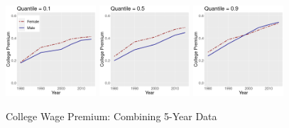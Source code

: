 \documentclass[beamer, t]{beamer}
\begin{document}
\begin{frame}
	
	\bigskip
	
	\begin{figure}[!h]
		\centering
		\caption{College Wage Premium: %
			Combining 5-Year Data %
		}
	\bigskip
			\includegraphics[width=0.3\textwidth]{chart_1_03_FullT_5yr.png}  \includegraphics[width=0.3\textwidth]{chart_5_03_FullT_5yr.png} \includegraphics[width=0.3\textwidth]{chart_9_03_FullT_5yr.png} 
			
	\end{figure}
	
\end{frame}
\end{document}
